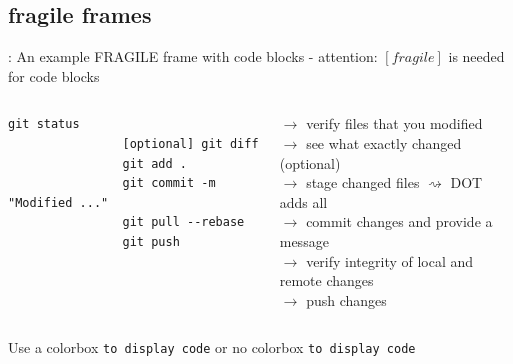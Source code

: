\subsection{fragile frames}
\begin{frame}[fragile]{\secname: \subsecname}
	An example FRAGILE frame with code blocks - attention: $[fragile]$ is needed for code blocks
	\begin{columns}[T]
		\begin{column}{.48\textwidth}
			\begin{lstlisting}[numbers=none]
				git status
				[optional] git diff
				git add .
				git commit -m "Modified ..."
				git pull --rebase
				git push
			\end{lstlisting}
		\end{column}
		\begin{column}{0.48\textwidth}
			\vspace{-0.18cm}
			\begin{tcolorbox}[colback=green_warm, colframe=orange_git!20!white, bottom=0mm, middle=0mm, boxsep=0.2mm, opacityframe=0.8, opacityfill=0.2, size=fbox]
				$\rightarrow$ verify files that you modified\vspace{0.09cm}\\\vspace{0.09cm}
				$\rightarrow$ see what exactly changed (optional)\\\vspace{0.09cm}
				$\rightarrow$ stage changed files $\rightsquigarrow$ DOT adds all	\\	\vspace{0.09cm}	
				$\rightarrow$ commit changes and provide a message \\\vspace{0.09cm}
				$\rightarrow$ verify integrity of local and remote changes\\\vspace{0.09cm}
				$\rightarrow$ push changes\vspace{0.2cm}
			\end{tcolorbox}
		\end{column}
	\end{columns}
	\begin{tcolorbox}[colbacktitle=gray!45!white, colback=gray!25!white, fonttitle=\bfseries, standard jigsaw,colframe=gray!25!white, bottom=0mm, middle=0mm, boxsep=0.2mm, opacityframe=0.5, opacityfill=0.7, opacitybacktitle=0.95, title filled, title=Inline code blocks, size=fbox]	
		\textcolor{green_warm}{	
			Use a colorbox \colorbox{black!80!blue}{\lstinline{to display code}} or no colorbox \lstinline{to display code}
		}
	\end{tcolorbox}
\end{frame}

